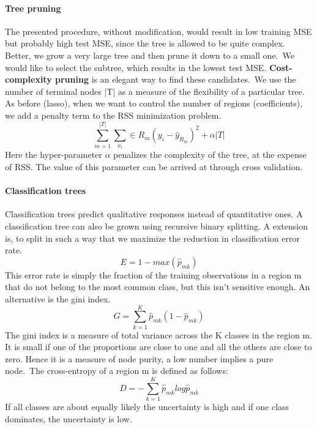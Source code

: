 \documentclass[../document.tex]{subfiles}
\begin{document}
	\paragraph{Tree pruning}
	The presented procedure, without modification, would result in low training MSE but probably high test MSE, since the tree is allowed to be quite complex. Better, we grow a very large tree and then prune it down to a small one.\
	We would like to select the subtree, which results in the lowest test MSE. \textbf{Cost-complexity pruning} is an elegant way to find these candidates.\
	We use the number of terminal nodes |T| as a measure of the flexibility of a particular tree. As before (lasso), when we want to control the number of regions (coefficients), we add a penalty term to the RSS minimization problem.
	\begin{equation}
		\sum_{m=1}^{|T|}\sum_{x_{i}} \in R_{m}(y_{i}-\hat{y}_{R_{m}})^2 + \alpha|T|
	\end{equation}
	Here the hyper-parameter \(\alpha\) penalizes the complexity of the tree, at the expense of RSS. The value of this parameter can be arrived at through cross validation.
	\paragraph{Classification trees}
	Classification trees predict qualitative responses instead of quantitative ones. A classification tree can also be grown using recursive binary splitting. A extension is, to split in such a way that we maximize the reduction in classification error rate.
	\begin{equation}
		E = 1-max(\hat{p}_{mk})
	\end{equation}
	This error rate is simply the fraction of the training observations in a region m that do not belong to the most common class, but this isn't sensitive enough. An alternative is the gini index.
	\begin{equation}
		G = \sum_{k=1}^{K}\hat{p}_{mk}(1-\hat{p}_{mk})
	\end{equation}
	The gini index is a measure of total variance across the K classes in the region m. It is small if one of the proportions are close to one and all the others are close to zero. Hence it is a measure of node purity, a low number implies a pure node.\
	The cross-entropy of a region m is defined as follows:
	\begin{equation}
		D = -\sum_{k=1}^{K}\hat{p}_{mk}log\hat{p}_{mk}
	\end{equation}
	If all classes are about equally likely the uncertainty is high and if one class dominates, the uncertainty is low.
\end{document}
